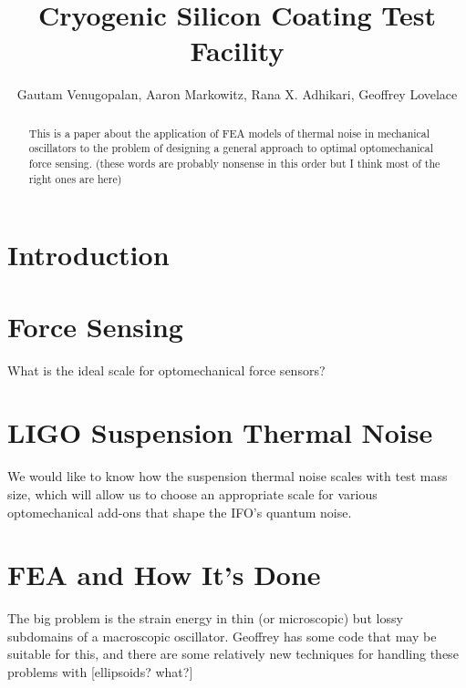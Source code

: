 \documentclass[twocolumn,amsmath,amssymb, resi]{revtex4}
\begin{document}
\title{Cryogenic Silicon Coating Test Facility}


\author{
 Gautam Venugopalan,
Aaron Markowitz,
Rana X. Adhikari,
Geoffrey Lovelace}
\vspace{1em}

 
\begin{abstract}

This is a paper about the application of FEA models of thermal noise in mechanical oscillators to the problem of designing a general approach to optimal optomechanical force sensing. (these words are probably nonsense in this order but I think most of the right ones are here)

\end{abstract}

\maketitle

\section{Introduction}



\section{Force Sensing}

What is the ideal scale for optomechanical force sensors?

\section{LIGO Suspension Thermal Noise}

We would like to know how the suspension thermal noise scales with test mass size, which will allow us to choose an appropriate scale for various optomechanical add-ons that shape the IFO's quantum noise.

\section{FEA and How It's Done}

The big problem is the strain energy in thin (or microscopic) but lossy subdomains of a macroscopic oscillator. Geoffrey has some code that may be suitable for this, and there are some relatively new techniques for handling these problems with [ellipsoids? what?]
\end{document}

